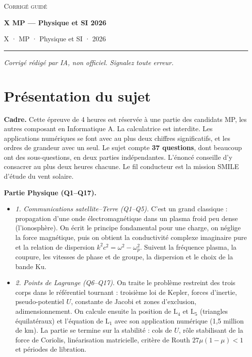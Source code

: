\documentclass[11pt,a4paper]{article}
\providecommand{\tightlist}{\setlength{\itemsep}{0pt}\setlength{\parskip}{0pt}}
\begin{document}
\thispagestyle{plain}
\begin{center}
  {\small\scshape Corrigé guidé}\par\smallskip
  {\LARGE\bfseries X MP — Physique et SI 2026\par}\medskip
  {\large X · MP · Physique et SI · 2026\par}
\end{center}
\vspace{2pt}\hrule\vspace{8pt}

\emph{Corrigé rédigé par IA, non officiel. Signalez toute erreur.}

\hypertarget{pruxe9sentation-du-sujet}{%
\section{Présentation du sujet}\label{pruxe9sentation-du-sujet}}

\textbf{Cadre.} Cette épreuve de 4 heures est réservée à une partie des candidats MP, les autres composant en Informatique A. La calculatrice est interdite. Les applications numériques se font avec au plus deux chiffres significatifs, et les ordres de grandeur avec un seul. Le sujet compte \textbf{37 questions}, dont beaucoup ont des sous-questions, en deux parties indépendantes. L'énoncé conseille d'y consacrer au plus deux heures chacune. Le fil conducteur est la mission SMILE d'étude du vent solaire.

\textbf{Partie Physique (Q1--Q17).}

\begin{itemize}
\tightlist
\item
  \emph{1. Communications satellite--Terre (Q1--Q5).} C'est un grand classique : propagation d'une onde électromagnétique dans un plasma froid peu dense (l'ionosphère). On écrit le principe fondamental pour une charge, on néglige la force magnétique, puis on obtient la conductivité complexe imaginaire pure et la relation de dispersion \(k^2c^2=\omega^2-\omega_p^2\). Suivent la fréquence plasma, la coupure, les vitesses de phase et de groupe, la dispersion et le choix de la bande Ku.
\item
  \emph{2. Points de Lagrange (Q6--Q17).} On traite le problème restreint des trois corps dans le référentiel tournant : troisième loi de Kepler, forces d'inertie, pseudo-potentiel \(U\), constante de Jacobi et zones d'exclusion, adimensionnement. On calcule ensuite la position de \(\mathrm L_4\) et \(\mathrm L_5\) (triangles équilatéraux) et l'équation de \(\mathrm L_1\) avec son application numérique (1,5 million de km). La partie se termine sur la stabilité : cols de \(U\), rôle stabilisant de la force de Coriolis, linéarisation matricielle, critère de Routh \(27\mu(1-\mu)<1\) et périodes de libration.
\end{itemize}
\end{document}
